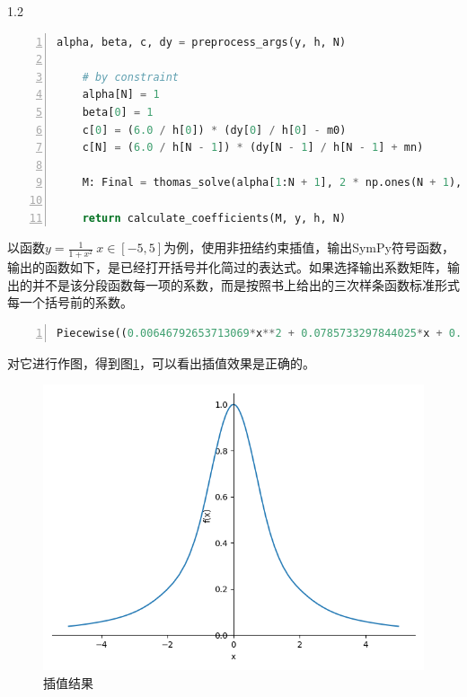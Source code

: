 \documentclass[a4paper,twoside]{article}
\begin{document}
\begin{spacing}{1.2}
\begin{lstlisting}[language=Python,numbers=left,style=PythonStyle,caption=一阶导数约束的实现,label={code:d1}]
	alpha, beta, c, dy = preprocess_args(y, h, N)
	
	# by constraint
	alpha[N] = 1
	beta[0] = 1
	c[0] = (6.0 / h[0]) * (dy[0] / h[0] - m0)
	c[N] = (6.0 / h[N - 1]) * (dy[N - 1] / h[N - 1] + mn)
	
	M: Final = thomas_solve(alpha[1:N + 1], 2 * np.ones(N + 1), beta[0:N], c)

	return calculate_coefficients(M, y, h, N)
\end{lstlisting}



以函数$y=\frac{1}{1+x^2} \ x \in [-5,5]$为例，使用非扭结约束插值，输出SymPy符号函数，输出的函数如下，是已经打开括号并化简过的表达式。如果选择输出系数矩阵，输出的并不是该分段函数每一项的系数，而是按照书上给出的三次样条函数标准形式每一个括号前的系数。

\begin{lstlisting}[language=Python,numbers=left,style=PythonStyle,caption=输出的结果,label={code:d1}]
Piecewise((0.00646792653713069*x**2 + 0.0785733297844025*x + 0.269630023955284, (x >= -5) & (x < -4)), (0.00787862656374767*x**3 + 0.101011445302103*x**2 + 0.456747404844291*x + 0.773862124035135, (x >= -4) & (x < -3)), (0.00649454351876496*x**3 + 0.0885546978972584*x**2 + 0.419377162629758*x + 0.736491881820602, (x >= -3) & (x < -2)), (0.107319669949428*x**3 + 0.693505456481235*x**2 + 1.62927867979771*x + 1.5430928932659, (x >= -2) & (x < -1)), (-0.435773223316476*x**3 - 0.935773223316476*x**2 + 1, (x >= -1) & (x < 0)), (0.435773223316476*x**3 - 0.935773223316476*x**2 + 1.11022302462516e-16*x + 1, (x >= 0) & (x < 1)), (-0.107319669949428*x**3 + 0.693505456481235*x**2 - 1.62927867979771*x + 1.5430928932659, (x >= 1) & (x < 2)), (-0.00649454351876498*x**3 + 0.0885546978972585*x**2 - 0.419377162629758*x + 0.736491881820602, (x >= 2) & (x < 3)), (-0.00787862656374766*x**3 + 0.101011445302103*x**2 - 0.45674740484429*x + 0.773862124035134, (x >= 3) & (x < 4)), (0.0064679265371307*x**2 - 0.0785733297844025*x + 0.269630023955284, (x >= 4) & (x < 5)))
\end{lstlisting}


对它进行作图，得到图\ref{fig:result}，可以看出插值效果是正确的。

\begin{figure}[h]
	\centering
	\caption{插值结果}
	\label{fig:result}
	\includegraphics[width=0.5\linewidth]{test.png}
\end{figure}


\end{spacing}
\end{document}

